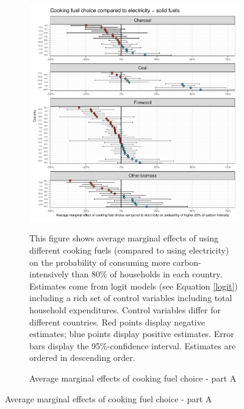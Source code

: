  \begin{figure}[ht!]\ContinuedFloat
   \centering
   \begin{subfigure}[b]{\textwidth}
   \centering
   \includegraphics{1_Figures/Analysis_Logit_Models_Marginal_Effects/Average_Marginal_Effects_affected_upper_80_CF_Electricity A_2017B.pdf}
   \caption{Average marginal effects of cooking fuel choice - part A} \label{fig:Logit_ME_CF_1}
   \begin{subcaption2}
     This figure shows average marginal effects of using different cooking fuels (compared to using electricity) on the probability of consuming more carbon-intensively than 80\% of households in each country. Estimates come from logit models (see Equation \ref{logit}) including a rich set of control variables including total household expenditures. Control variables differ for different countries. Red points display negative estimates; blue points display positive estimates. Error bars display the 95\%-confidence interval. Estimates are ordered in descending order.
   \end{subcaption2}
   \end{subfigure}
 \end{figure}
 \clearpage

